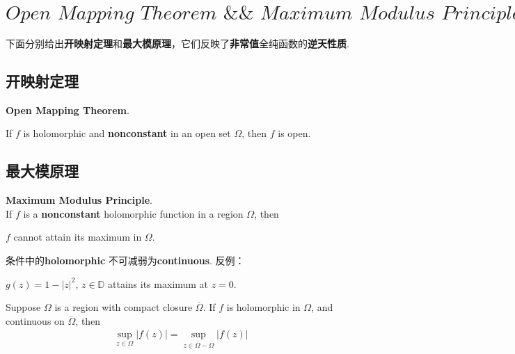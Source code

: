 \newpage

\section{$Open \,\, Mapping \,\, Theorem \,\, \&\& \,\, Maximum \,\, Modulus \,\, Principle$}
	下面分别给出\textbf{开映射定理}和\textbf{最大模原理}，它们反映了\textbf{非常值}全纯函数的\textbf{逆天性质}.

\vspace*{2em}
\subsection{开映射定理}
	\begin{thm}\label{thm 11.2.1}
		\textbf{Open Mapping Theorem}. 
		\begin{center}
			If $f$ is holomorphic and \textbf{nonconstant} in an open set $\Omega$, then $f$ is open.
		\end{center}
	\end{thm}

\vspace*{6em}
\subsection{最大模原理}
	\begin{thm}\label{thm 11.2.2}
		\textbf{Maximum Modulus Principle}. \\
		If $f$ is a \textbf{nonconstant} holomorphic function in a region $\Omega$, then
		\begin{center}
			$f$ cannot attain its maximum in $\Omega$.
		\end{center}
		
		\vspace*{2em}
		\begin{rmk}
			条件中的\textbf{holomorphic} 不可减弱为\textbf{continuous}. 反例：
			\begin{center}
				$g(z) = 1 - \left| z \right|^2$, $z \in \mathbb{D}$ attains its maximum at $z = 0$.
			\end{center}
		\end{rmk}
	\end{thm}
	
	\vspace*{2em}
	
	\begin{corollary}\label{cor 11.2.3}
		Suppose $\Omega$ is a region with compact closure $\overline{\Omega}$. If $f$ is holomorphic in $\Omega$, and continuous on $\overline{\Omega}$, then
		\begin{align}
			\sup_{z \in \Omega}{\left| f(z) \right|} = \sup_{z \in \overline{\Omega} - \Omega}{\left| f(z) \right|}
		\end{align}
	\end{corollary}

